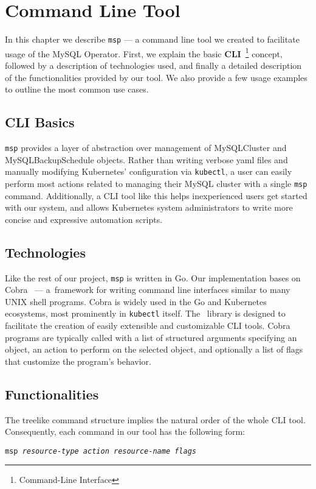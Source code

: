 \chapter{Command Line Tool}
In this chapter we describe \texttt{msp} --- a command line tool we created
to facilitate usage of the MySQL Operator. First, we explain the basic
\textbf{CLI}~\footnote{Command-Line Interface} concept, followed by a description
of technologies used, and finally a detailed description of the functionalities
provided by our tool. We also provide a few usage examples to outline the most
common use cases.

\section{CLI Basics}
\texttt{msp} provides a layer of abstraction over management of MySQLCluster
and MySQLBackupSchedule objects. Rather than writing verbose yaml files and manually
modifying Kubernetes’ configuration via \texttt{kubectl}, a user can easily
perform most actions related to managing their MySQL cluster with a single
\texttt{msp} command. Additionally, a CLI tool like this helps inexperienced users
get started with our system, and allows Kubernetes system administrators to
write more concise and expressive automation scripts.

\section{Technologies}
Like the rest of our project, \texttt{msp} is written in Go. Our implementation
bases on Cobra~\cite{cobra} --- a~framework for writing command line interfaces
similar to many UNIX shell programs. Cobra is widely used in the Go and
Kubernetes ecosystems, most prominently in \texttt{kubectl} itself. The~ library
is designed to facilitate the creation of easily extensible and
customizable CLI tools. Cobra programs are typically called with a list
of structured arguments specifying an object, an action to perform on the
selected object, and optionally a list of flags that customize the program’s
behavior.

\section{Functionalities}
The treelike command structure implies the natural order of the whole CLI
tool. Consequently, each command in our tool has the following form:

\vspace{.75em}
\centerline{\texttt{msp \textit{resource-type action resource-name flags}}}
\vspace{.75em}

